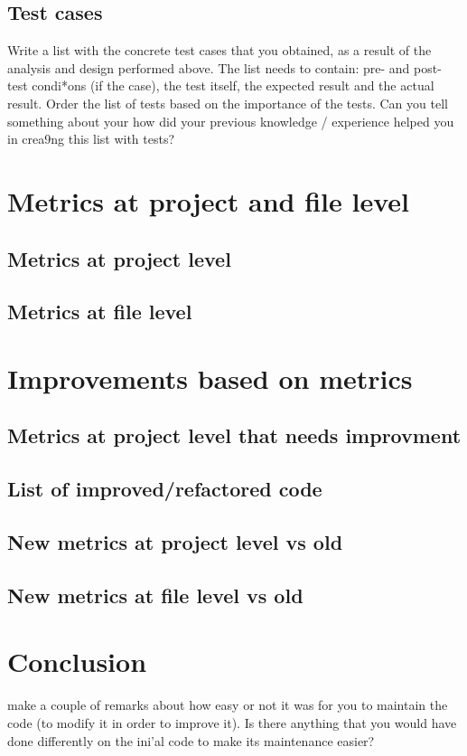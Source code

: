 \documentclass{article}
\begin{document}
\subsection{Test cases}
Write a list with the concrete test cases that you obtained, as a result of the analysis and design
performed above. The list needs to contain: pre- and post- test condi*ons (if the case), the test itself, the
expected result and the actual result. Order the list of tests based on the importance of the tests. Can
you tell something about your how did your previous knowledge / experience helped you in crea9ng this
list with tests?

\section{Metrics at project and file level}

\subsection{Metrics at project level}

\subsection{Metrics at file level}

\section{Improvements based on metrics}

\subsection{Metrics at project level that needs improvment}

\subsection{List of improved/refactored code}

\subsection{New metrics at project level vs old}

\subsection{New metrics at file level vs old}

\section{Conclusion}
make a couple of remarks about how easy or not it was for you to maintain the code
(to modify it in order to improve it). Is there anything that you would have done differently on
the ini'al code to make its maintenance easier?
\end{document}

